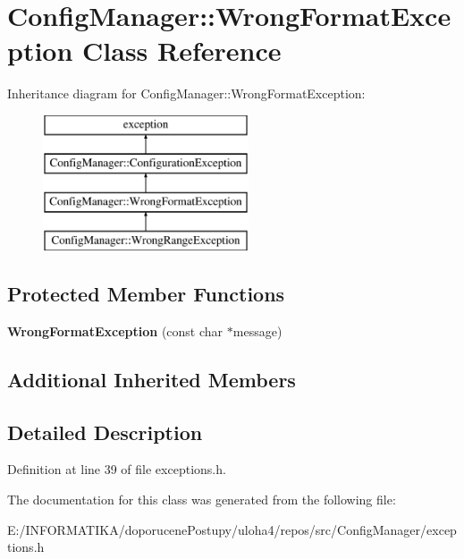 \hypertarget{class_config_manager_1_1_wrong_format_exception}{}\section{Config\+Manager\+:\+:Wrong\+Format\+Exception Class Reference}
\label{class_config_manager_1_1_wrong_format_exception}
Inheritance diagram for Config\+Manager\+:\+:Wrong\+Format\+Exception\+:\begin{figure}[H]
\begin{center}
\leavevmode
\includegraphics[height=4.000000cm]{class_config_manager_1_1_wrong_format_exception}
\end{center}
\end{figure}
\subsection*{Protected Member Functions}
\begin{DoxyCompactItemize}
\item 
{\bfseries Wrong\+Format\+Exception} (const char $\ast$message)\hypertarget{class_config_manager_1_1_wrong_format_exception_aa38389d999dd1c463fb887a36980b7ce}{}\label{class_config_manager_1_1_wrong_format_exception_aa38389d999dd1c463fb887a36980b7ce}

\end{DoxyCompactItemize}
\subsection*{Additional Inherited Members}


\subsection{Detailed Description}


Definition at line 39 of file exceptions.\+h.



The documentation for this class was generated from the following file\+:\begin{DoxyCompactItemize}
\item 
E\+:/\+I\+N\+F\+O\+R\+M\+A\+T\+I\+K\+A/doporucene\+Postupy/uloha4/repos/src/\+Config\+Manager/exceptions.\+h\end{DoxyCompactItemize}
